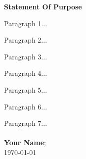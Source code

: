 \documentclass{article}
\begin{document}
\begin{center}
\huge{\textbf{Statement Of Purpose}}
\end{center}

\large
\noindent 
Paragraph 1...

Paragraph 2...

Paragraph 3...

Paragraph 4...

Paragraph 5...

Paragraph 6...

Paragraph 7...
\\ \\
\noindent
\textbf{Your Name};
\\ 
\noindent 
\today
\end{document}
